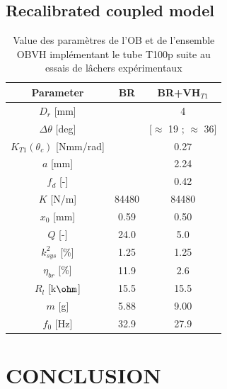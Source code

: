 \documentclass[3p,twocolumn,preprint]{elsarticle}
\begin{document}
	\subsection{Recalibrated coupled model}
\begin{table}[!htbp]
	\centering
		\begin{tabular}[t]{c|c|c}
\toprule
\multicolumn{1}{c}{\textbf{Parameter}}	&
\multicolumn{1}{c}{\textbf{BR}} 	& 
\multicolumn{1}{c}{\textbf{BR+VH$_{T1}$}}  \\
\midrule
$D_r$ [mm] 						& \cellcolor{ashgrey} 		& {4} 		\\ \hline
$\Delta\theta$ [deg] 			& \cellcolor{ashgrey} 		& {{[$\approx$ 19 ; $\approx$ 36]}} \\ \hline
$K_{T1}(\theta_c)$ [Nmm/rad]	& \cellcolor{ashgrey}  		&  0.27 		\\ \hline
$a$ [mm]         			    & \cellcolor{ashgrey}  		&  2.24		\\ \hline
$f_d$ [-] 						& \cellcolor{ashgrey}  		&  0.42  		\\ \hline
$K$ [N/m] 						&	84480			  	 	&  84480  			\\ \hline
$x_0$ [mm] 						& {0.59}					& {0.50}  	\\ \hline
$Q$	[-] 						& 		24.0		 		& 5.0     					\\ \hline
$k^2_{sys}$ [\%] 				& 		1.25		 		& {1.25}   	\\ \hline
$\eta_{br}$ [\%] 				& 		11.9		 		& 2.6   \\ \hline	
$R_l$ [k$\text{\ohm}$] 			&	{15.5}					& {15.5}   	\\ \hline		
$m$	[g]						    &	{5.88}					& 9.00   		\\ \hline	
$f_0$ [Hz]						&		32.9				& 27.9   					\\
\bottomrule	
	\end{tabular}
        \caption{Value des paramètres de l'OB et de l'ensemble OBVH implémentant le tube T100p suite au essais de lâchers expérimentaux}
        \label{tab:parametres lacher tube}
\end{table}        
\section{CONCLUSION}
\label{sec:CONCLUSION}






% 
\end{document}
